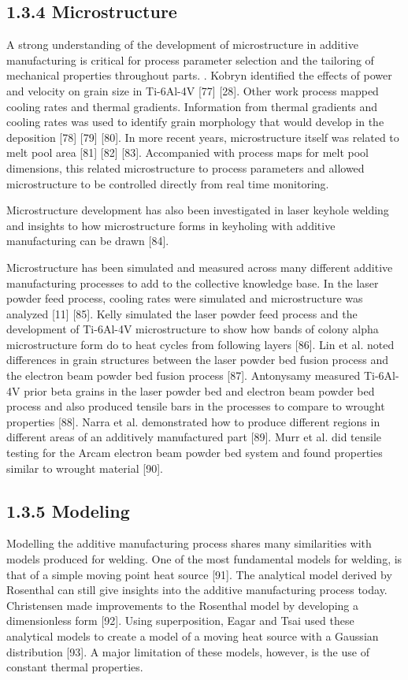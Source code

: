 \documentclass[10pt]{article}
\begin{document}
\subsection*{1.3.4 Microstructure}
A strong understanding of the development of microstructure in additive manufacturing is critical for process parameter selection and the tailoring of mechanical properties throughout parts. . Kobryn identified the effects of power and velocity on grain size in Ti-6Al-4V [77] [28]. Other work process mapped cooling rates and thermal gradients. Information from thermal gradients and cooling rates was used to identify grain morphology that would develop in the deposition [78] [79] [80]. In more recent years, microstructure itself was related to melt pool area [81] [82] [83]. Accompanied with process maps for melt pool dimensions, this related microstructure to process parameters and allowed microstructure to be controlled directly from real time monitoring.

Microstructure development has also been investigated in laser keyhole welding and insights to how microstructure forms in keyholing with additive manufacturing can be drawn [84].

Microstructure has been simulated and measured across many different additive manufacturing processes to add to the collective knowledge base. In the laser powder feed process, cooling rates were simulated and microstructure was analyzed [11] [85]. Kelly simulated the laser powder feed process and the development of Ti-6Al-4V microstructure to show how bands of colony alpha microstructure form do to heat cycles from following layers [86]. Lin et al. noted differences in grain structures between the laser powder bed fusion process and the electron beam powder bed fusion process [87]. Antonysamy measured Ti-6Al-4V prior beta grains in the laser powder bed and electron beam powder bed process and also produced tensile bars in the processes to compare to wrought properties [88]. Narra et al. demonstrated how to produce different regions in different areas of an additively manufactured part [89]. Murr et al. did tensile testing for the Arcam electron beam powder bed system and found properties similar to wrought material [90].

\subsection*{1.3.5 Modeling}
Modelling the additive manufacturing process shares many similarities with models produced for welding. One of the most fundamental models for welding, is that of a simple moving point heat source [91]. The analytical model derived by Rosenthal can still give insights into the additive manufacturing process today. Christensen made improvements to the Rosenthal model by developing a dimensionless form [92]. Using superposition, Eagar and Tsai used these analytical models to create a model of a moving heat source with a Gaussian distribution [93]. A major limitation of these models, however, is the use of constant thermal properties.
\end{document}
